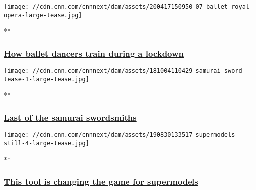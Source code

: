 \href{/videos/arts/2020/04/20/royal-ballet-opera-house-lockdown-style-orig.cnn/video/playlists/cnn-style/}{}

\texttt{[image: //cdn.cnn.com/cnnnext/dam/assets/200417150950-07-ballet-royal-opera-large-tease.jpg]}

**

\hypertarget{how-ballet-dancers-train-during-a-lockdown}{%
\subsubsection{\texorpdfstring{\href{/videos/arts/2020/04/20/royal-ballet-opera-house-lockdown-style-orig.cnn/video/playlists/cnn-style/}{How
ballet dancers train during a
lockdown}}{How ballet dancers train during a lockdown}}\label{how-ballet-dancers-train-during-a-lockdown}}

\href{/videos/arts/2018/10/15/fusahiro-shimojima-samurai-swordsmith-style-orig.cnn/video/playlists/cnn-style/}{}

\texttt{[image: //cdn.cnn.com/cnnnext/dam/assets/181004110429-samurai-sword-tease-1-large-tease.jpg]}

**

\hypertarget{last-of-the-samurai-swordsmiths-}{%
\subsubsection{\texorpdfstring{\href{/videos/arts/2018/10/15/fusahiro-shimojima-samurai-swordsmith-style-orig.cnn/video/playlists/cnn-style/}{Last
of the samurai swordsmiths
}}{Last of the samurai swordsmiths }}\label{last-of-the-samurai-swordsmiths-}}

\href{/videos/fashion/2019/08/28/what-it-takes-to-be-a-supermodel-style-capital-orig.cnn/video/playlists/cnn-style/}{}

\texttt{[image: //cdn.cnn.com/cnnnext/dam/assets/190830133517-supermodels-still-4-large-tease.jpg]}

**

\hypertarget{this-tool-is-changing-the-game-for-supermodels-}{%
\subsubsection{\texorpdfstring{\href{/videos/fashion/2019/08/28/what-it-takes-to-be-a-supermodel-style-capital-orig.cnn/video/playlists/cnn-style/}{This
tool is changing the game for supermodels
}}{This tool is changing the game for supermodels }}\label{this-tool-is-changing-the-game-for-supermodels-}}

